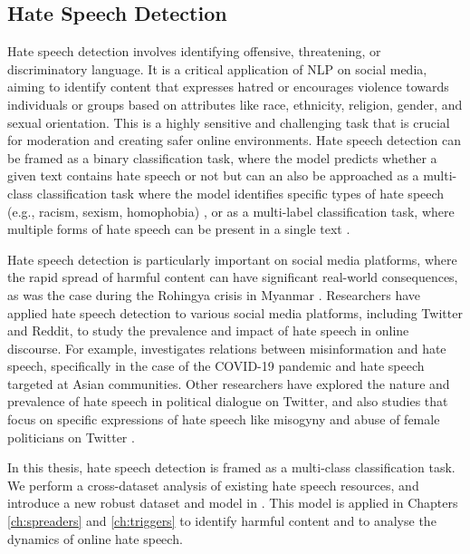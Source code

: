 \subsection{Hate Speech Detection}
Hate speech detection involves identifying offensive, threatening, or discriminatory language. It is a critical application of \ac{NLP} on social media, aiming to identify content that expresses hatred or encourages violence towards individuals or groups based on attributes like race, ethnicity, religion, gender, and sexual orientation. 
This is a highly sensitive and challenging task that is crucial for moderation and creating safer online environments. Hate speech detection can be framed as a binary classification task, where the model predicts whether a given text contains hate speech or not \cite{saleh2023detection} but can an also be approached as a multi-class classification task where the model identifies specific types of hate speech (e.g., racism, sexism, homophobia) \cite{qureshi2021compromised}, or as a multi-label classification task, where multiple forms of hate speech can be present in a single text \cite{dirting2022multi}.

Hate speech detection is particularly important on social media platforms, where the rapid spread of harmful content can have significant real-world consequences, as was the case during the Rohingya crisis in Myanmar \cite{nourooz2023transitional}. Researchers have applied hate speech detection to various social media platforms, including Twitter and Reddit, to study the prevalence and impact of hate speech in online discourse. For example, \citet{kim2021misinformation} investigates relations between misinformation and hate speech, specifically in the case of the COVID-19 pandemic and hate speech targeted at Asian communities. Other researchers \cite{agarwal2021hate} have explored the nature and prevalence of hate speech in political dialogue on Twitter, and also studies that focus on specific expressions of hate speech like misogyny and abuse of female politicians on Twitter \cite{fuchs2021normalizing}.

In this thesis, hate speech detection is framed as a multi-class classification task. We perform a cross-dataset analysis of existing hate speech resources, and introduce a new robust dataset and model in . This model is applied in Chapters \ref{ch:spreaders} and \ref{ch:triggers} to identify harmful content and to analyse the dynamics of online hate speech.

